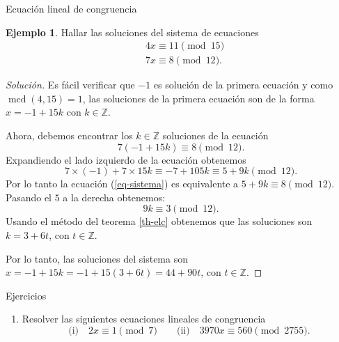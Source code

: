 \documentclass[11pt,spanish,makeidx]{amsbook}
\theoremstyle{definition}
\newtheorem{ejemplo}{Ejemplo}[section]
\theoremstyle{remark}
\newcommand \ZZ{{\mathbb Z}}
\newcommand \mcd{\operatorname{mcd}}
\begin{document}
\begin{section}{Ecuación lineal de congruencia}
\begin{ejemplo} Hallar las soluciones del sistema de ecuaciones
	\begin{align*}
		&4x\equiv 11 \pmod{15} \\
		&7x\equiv 8 \pmod{12}.	
	\end{align*}
\end{ejemplo}
\begin{proof}[Solución] 
	Es fácil verificar que  $-1$ es solución de la primera ecuación y como $\mcd(4,15)=1$, las soluciones  de la primera ecuación son de la forma $x= -1 + 15k$ con $k \in \ZZ$. 
	
	Ahora, debemos encontrar los $k \in \ZZ$ soluciones de la ecuación
	\begin{equation}\label{eq-sistema}
		7(-1 + 15k)\equiv 8 \pmod{12}.
	\end{equation}
	Expandiendo el lado izquierdo de la ecuación obtenemos
	\begin{equation*}
		7\times (-1) + 7\times 15 k\equiv -7 + 105 k\equiv 5 + 9k \pmod{12}.
	\end{equation*}
	Por lo tanto la ecuación  (\ref{eq-sistema}) es equivalente a $5 + 9k \equiv 8 \pmod{12}$. Pasando el $5$ a la derecha obtenemos:
	\begin{equation}
		9k \equiv 3 \pmod{12}.
	\end{equation}
	Usando el método del teorema \ref{th-elc} obtenemos que las soluciones son  $k = 3 + 6t$, con $t \in \ZZ$. 
	
	Por lo tanto, las soluciones del sistema son $x =  -1 + 15k =  -1 + 15(3 + 6t)= 44 + 90t$, con $t \in \ZZ$. 
\end{proof}


\begin{subsection}{Ejercicios}
\begin{enumerate}
\item  Resolver las siguientes ecuaciones lineales de congruencia
$$ \text{(i)}\quad 2x \equiv 1 \pmod{7}\qquad
 \text{(ii)}\quad 3970x \equiv 560 \pmod{2755}.
$$
\end{enumerate}
\end{subsection}

\end{section}
\end{document}
